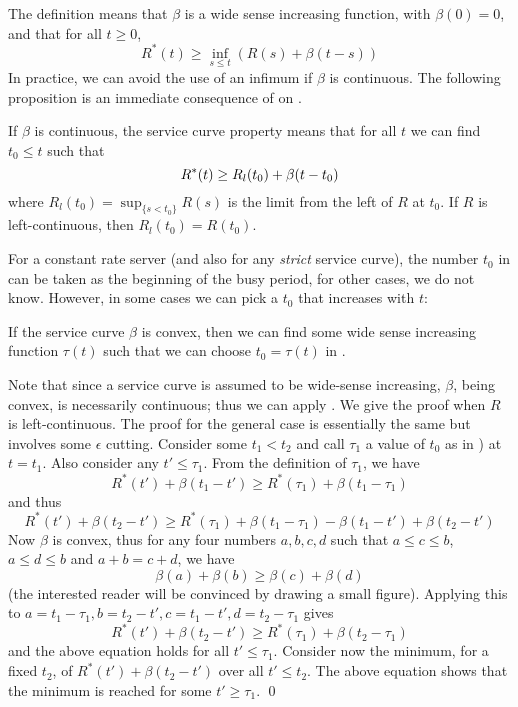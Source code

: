 The definition means that $\beta$ is a wide sense increasing
function, with $\beta(0)=0$, and that for all $t\geq 0$,
$$
  R^{*}(t) \geq \inf_{s \leq t} \left(R(s)  + \beta(t-s)\right)
$$
In practice, we can avoid the use of an infimum if $\beta$ is
continuous. The following proposition is an immediate consequence
of  on .
\begin{proposition}
 If $\beta$ is continuous, the service
curve property means that for all $t$ we can find $t_0 \leq t$
such that
\begin{equation}\mylabel{eq-sercur-d2a}
  R^{*}(t) \geq R_l(t_{0}) + \beta(t-t_{0})
\end{equation}
where $R_l(t_0)= \sup_{\{s < t_0\}} R(s)$ is the limit from the left
of $R$ at $t_0$. If $R$ is left-continuous, then
$R_l(t_0)=R(t_0)$.
\end{proposition}

For a constant rate server (and also for any \emph{strict} service
curve), the number $t_0$ in  can be taken as the
beginning of the busy period, for other cases, we do not know.
However, in some cases we can pick a $t_0$ that increases with $t$:

\begin{proposition}
 If the service curve $\beta$ is convex,
then we can find some wide sense increasing function $\tau(t)$
such that we can choose $t_0=\tau(t)$ in .
\end{proposition}
Note that since a service curve is assumed to be wide-sense
increasing, $\beta$, being convex, is necessarily continuous; thus
we can apply .
\pr
We give the proof when $R$ is left-continuous. The proof for the
general case is essentially the same but involves some $\epsilon$
cutting. Consider some $t_1 < t_2$ and call $\tau_1$ a value of
$t_0$ as in ) at $t=t_1$. Also consider any
$t' \leq \tau_1$.  From the definition of $\tau_1$, we have
$$
R^*(t') + \beta(t_1 - t' ) \geq R^*(\tau_1) + \beta(t_1 - \tau_1 )
$$
and thus
$$
R^*(t') + \beta(t_2 - t' ) \geq R^*(\tau_1) + \beta(t_1 - \tau_1 )
- \beta(t_1 - t' ) + \beta(t_2 - t' )
$$
Now $\beta$ is convex, thus for any four numbers $a, b, c, d$ such
that $a \leq c  \leq b$,  $a \leq d  \leq b$ and $a+b=c+d$, we
have
$$\beta(a) + \beta(b) \geq \beta(c) + \beta(d)$$
(the interested reader will be convinced by drawing a small
figure). Applying this to $a=t_1- \tau_1, b=t_2 - t', c=t_1-t',
d=t_2-\tau_1$ gives
$$
R^*(t')+ \beta(t_2-t') \geq R^*(\tau_1)+\beta(t_2 - \tau_1)
$$
and the above equation holds for all $t'\leq \tau_1$. Consider now
the minimum, for a fixed $t_2$, of $R^*(t') +\beta(t_2-t')$ over
all $t' \leq t_2$. The above equation shows that the minimum is
reached for some $t' \geq \tau_1$. \qed

